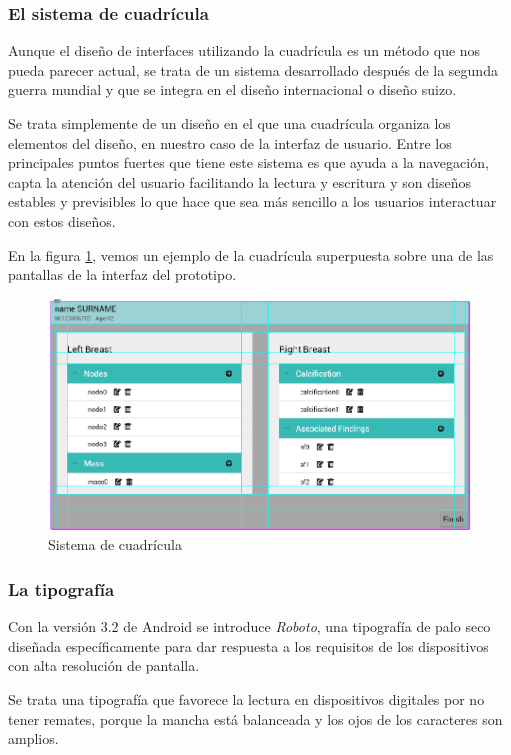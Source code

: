 \subsubsection{El sistema de cuadrícula}
Aunque el diseño de interfaces utilizando la cuadrícula es un método que nos pueda parecer actual, se trata de un sistema desarrollado después de la segunda guerra mundial y que se integra en el diseño internacional o diseño suizo.\par
Se trata simplemente de un diseño en el que una cuadrícula organiza los elementos del diseño, en nuestro caso de la interfaz de usuario. Entre los principales puntos fuertes que tiene este sistema es que ayuda a la navegación, capta la atención del usuario facilitando la lectura y escritura y son diseños estables y previsibles lo que hace que sea más sencillo a los usuarios interactuar con estos diseños.\par
En la figura \ref{fig:grid}, vemos un ejemplo de la cuadrícula superpuesta sobre una de las pantallas de la interfaz del prototipo. 

\begin{figure}[ht]
\centering
\includegraphics[scale=0.5]{./imgs/ui/grid.png}
\caption{Sistema de cuadrícula}
\label{fig:grid}
\end{figure}

\subsubsection{La tipografía}
Con la versión 3.2 de Android se introduce \emph{Roboto}, una tipografía de palo seco diseñada específicamente para dar respuesta a los requisitos de los dispositivos con alta resolución de pantalla.\par
Se trata una tipografía que favorece la lectura en dispositivos digitales por no tener remates, porque la mancha está balanceada y los ojos de los caracteres son amplios.\par

